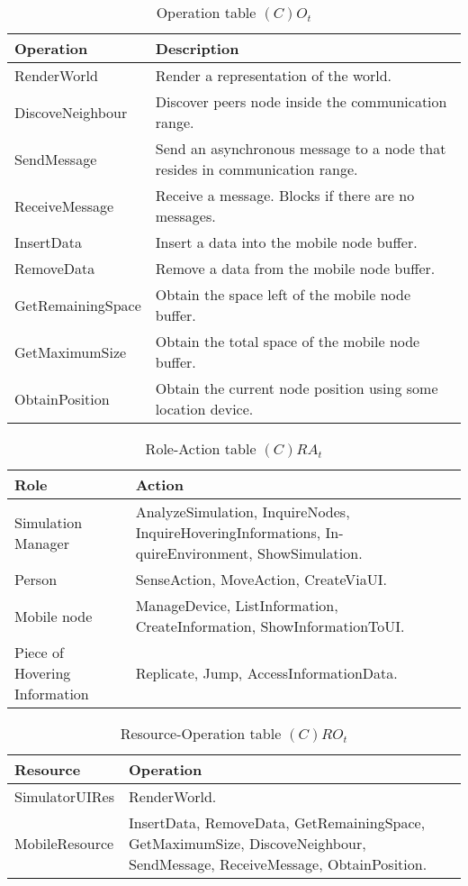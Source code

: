 \begin{table}[H]
	\centering
	\begin{tabular}{|p{4cm}|p{8cm}|}
			\hline
			\textbf{Operation} & \textbf{Description} \\
			\hline
			RenderWorld & Render a representation of the world. \\
			\hline
			DiscoveNeighbour & Discover peers node inside the communication range. \\
			\hline
      SendMessage & Send an asynchronous message to a node that resides in
      communication range. \\
			\hline
      ReceiveMessage & Receive a message. Blocks if there are no messages. \\
			\hline
			InsertData & Insert a data into the mobile node buffer. \\
			\hline
			RemoveData & Remove a data from the mobile node buffer. \\
			\hline
			GetRemainingSpace & Obtain the space left of the mobile node buffer. \\
			\hline
			GetMaximumSize & Obtain the total space of the mobile node buffer. \\
			\hline
			ObtainPosition & Obtain the current node position using some location
			device. \\
			\hline
		\end{tabular}
	\caption{Operation table $(C)O_t$}
	\label{tab:cot}
\end{table}

\begin{table}[H]
	\centering
	\begin{tabular}{|p{4cm}|p{8cm}|}
			\hline
			\textbf{Role} & \textbf{Action} \\
			\hline
			Simulation Manager & AnalyzeSimulation, InquireNodes, InquireHoveringInformations, In-
			quireEnvironment, ShowSimulation. \\
			\hline
			Person & SenseAction, MoveAction, CreateViaUI. \\
			\hline
			Mobile node & ManageDevice, ListInformation, CreateInformation, ShowInformationToUI.  \\
			\hline
			Piece of Hovering Information & Replicate, Jump, AccessInformationData. \\
			\hline
		\end{tabular}
	\caption{Role-Action table $(C)RA_t$}
	\label{tab:rat}
\end{table}

\begin{table}[H]
	\centering
	\begin{tabular}{|p{4cm}|p{8cm}|}
			\hline
			\textbf{Resource} & \textbf{Operation} \\
			\hline
			SimulatorUIRes & RenderWorld. \\
			\hline
			MobileResource & InsertData, RemoveData, GetRemainingSpace,
			GetMaximumSize, DiscoveNeighbour, SendMessage, ReceiveMessage, ObtainPosition. \\
			\hline
		\end{tabular}
	\caption{Resource-Operation table $(C)RO_t$}
	\label{tab:crot}
\end{table}

